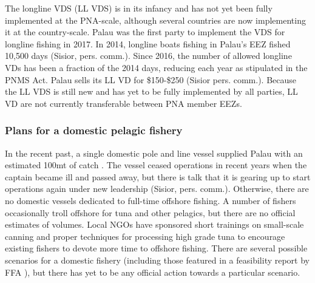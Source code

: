 \documentclass[9p,twocolumn,twoside,lineno]{pnas-new}
\begin{document}
The longline VDS (LL VDS) is in its infancy and has not yet been fully implemented at the PNA-scale, although several countries are now implementing it at the country-scale. Palau was the first party to implement the VDS for longline fishing in 2017. In 2014, longline boats fishing in Palau’s EEZ fished 10,500 days (Sisior, pers. comm.). Since 2016, the number of allowed longline VDs has been a fraction of the 2014 days, reducing each year as stipulated in the PNMS Act. Palau sells its LL VD for \$150-\$250 (Sisior pers. comm.). Because the LL VDS is still new and has yet to be fully implemented by all parties, LL VD are not currently transferable between PNA member EEZs. 

\subsubsection{Plans for a domestic pelagic fishery}

In the recent past, a single domestic pole and line vessel supplied Palau with an estimated 100mt of catch \cite{Gillett2016}. The vessel ceased operations in recent years when the captain became ill and passed away, but there is talk that it is gearing up to start operations again under new leadership (Sisior, pers. comm.). Otherwise, there are no domestic vessels dedicated to full-time offshore fishing. A number of fishers occasionally troll offshore for tuna and other pelagics, but there are no official estimates of volumes. 
Local NGOs have sponsored short trainings on small-scale canning and proper techniques for processing high grade tuna to encourage existing fishers to devote more time to offshore fishing. There are several possible scenarios for a domestic fishery (including those featured in a feasibility report by FFA \citep{Skirtun2017}), but there has yet to be any official action towards a particular scenario. 
\end{document}
